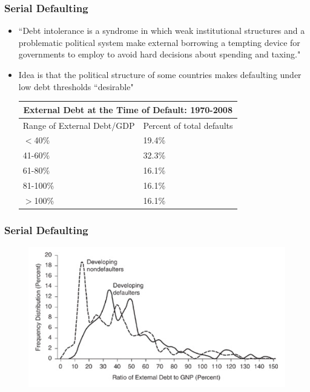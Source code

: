 \documentclass{beamer}
\begin{document}
\begin{frame}
\frametitle{Serial Defaulting}
\begin{itemize}
\item ``Debt intolerance is a syndrome in which weak institutional structures and a problematic political system make external borrowing a tempting device for
governments to employ to avoid hard decisions about spending and taxing."
\bigskip
\item Idea is that the political structure of some countries makes defaulting under low debt thresholds ``desirable"
\begin{table}
\begin{tabular}{ll}
\multicolumn{2}{c}{External Debt at the Time of Default: 1970-2008}\\
\hline\hline
Range of External Debt/GDP & Percent of total defaults\\
\hline
$<$40\% & 19.4\% \\
41-60\% & 32.3\% \\
61-80\% & 16.1\% \\
81-100\% & 16.1\% \\
$>$100\% & 16.1\% \\
\hline\hline
\end{tabular}
\end{table} 
\end{itemize}
\end{frame}

\begin{frame}
\frametitle{Serial Defaulting}
\begin{figure}
\centering
\includegraphics[scale=0.4]{RR3.png}
\end{figure}
\end{frame}
\end{document}
